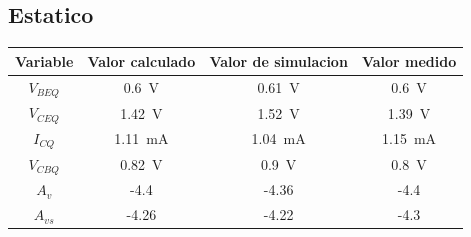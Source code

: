 \documentclass[a4paper,12pt]{article}
\newcommand{\mI}[1]{\SI{#1}{\milli\ampere}}
\newcommand{\mV}[1]{\SI{#1}{\volt}}
\begin{document}
\subsection{Estatico}
\begin{table}[h]
    \centering
    \begin{tabular}{|c|c|c|c|}
        \hline
        Variable & Valor calculado      & Valor de simulacion & Valor medido      \\ \hline
        $V_{BEQ}$     & \mV{0.6}        & \mV{0.61}           & \mV{0.6}          \\ \hline
        $V_{CEQ}$     & \mV{1.42}       & \mV{1.52}           & \mV{1.39}         \\ \hline
        $I_{CQ}$      & \mI{1.11}       & \mI{1.04}           & \mI{1.15}         \\ \hline
        $V_{CBQ}$     & \mV{0.82}       & \mV{0.9}            & \mV{0.8}          \\ \hline
        $A_v$         & -4.4            & -4.36               & -4.4              \\ \hline
        $A_{vs}$      & -4.26           & -4.22               & -4.3              \\ \hline
    \end{tabular}
\end{table}
\end{document}
